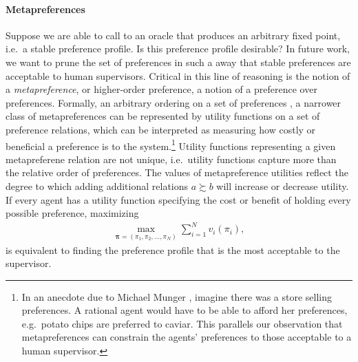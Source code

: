 \documentclass[conference]{ieeeconf}
\newcommand{\prefers}{\succsim}
\newcommand{\profile}{\boldsymbol{\pi}}
\begin{document}
\paragraph*{Metapreferences}
Suppose we are able to call to an oracle that produces an arbitrary fixed point, i.e.~a stable preference profile. Is this preference profile desirable? In future work, we want to prune the set of preferences in such a away that stable preferences are acceptable to human supervisors. Critical in this line of reasoning is the notion of a \emph{metapreference},  or higher-order preference, a notion of a preference over preferences. Formally, an arbitrary ordering on a set of preferences \cite{lutskanov2015}, a narrower class of metapreferences can be represented by utility functions on a set of preference relations, which can be interpreted as measuring how costly or beneficial a preference is to the system.\footnote{In an anecdote due to Michael Munger \cite{munger2019}, imagine there was a store selling preferences. A rational agent would have to be able to afford her preferences, e.g.~potato chips are preferred to  caviar. This parallels our observation that metapreferences can constrain the agents' preferences to those acceptable to a human supervisor.} Utility functions representing a given metapreferene relation are not unique, i.e.~utility functions capture more than the relative order of preferences. The values of metapreference utilities reflect the degree to which adding additional relations $a \prefers b$ will increase or decrease utility. If every agent has a utility function specifying the cost or benefit of holding every possible preference, maximizing
\begin{align}
    \max_{\profile = (\pi_1,\pi_2,\dots,\pi_N)} \sum_{i=1}^N v_i(\pi_i), \label{eq:dist-opt}
\end{align}
is equivalent to finding the preference profile that is the most acceptable to the supervisor.
\end{document}
